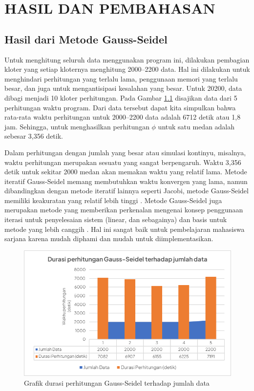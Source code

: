 \chapter{HASIL DAN PEMBAHASAN}

\section{Hasil dari Metode Gauss-Seidel}
Untuk menghitung seluruh data menggunakan program ini, dilakukan pembagian kloter yang setiap kloternya menghitung 2000--2200 data. Hal ini dilakukan untuk menghindari perhitungan yang terlalu lama, penggunaan memori yang terlalu besar, dan juga untuk mengantisipasi kesalahan yang besar. Untuk 20200, data dibagi menjadi 10 kloter perhitungan. Pada Gambar \ref{grafik_durasi} disajikan data dari 5 perhitungan waktu program. Dari data tersebut dapat kita simpulkan bahwa rata-rata waktu perhitungan untuk 2000--2200 data adalah 6712 detik atau 1,8 jam. Sehingga, untuk menghasilkan perhitungan $\phi$ untuk satu medan adalah sebesar 3,356 detik.

Dalam perhitungan dengan jumlah yang besar atau simulasi kontinyu, misalnya, waktu perhitungan merupakan sesuatu yang sangat berpengaruh. Waktu 3,356 detik untuk sekitar 2000 medan akan memakan waktu yang relatif lama. Metode iteratif Gauss-Seidel memang membutuhkan waktu konvergen yang lama, namun dibandingkan dengan metode iteratif lainnya seperti Jacobi, metode Gauss-Seidel memiliki keakuratan yang relatif lebih tinggi \citep{Ford2015}. Metode Gauss-Seidel juga merupakan metode yang memberikan perkenalan mengenai konsep penggunaan iterasi untuk penyelesaian sistem (linear, dan sebagainya) dan basis untuk metode yang lebih canggih . Hal ini sangat baik untuk pembelajaran mahasiswa sarjana karena mudah diphami dan mudah untuk diimplementasikan.
\begin{figure}[h!]
    \centering
    \includegraphics[width=12cm]{gambar/grafik_durasi.png}
    \caption{Grafik durasi perhitungan Gauss-Seidel terhadap jumlah data}
    \label{grafik_durasi}
\end{figure}

